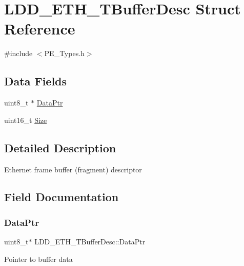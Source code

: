 \hypertarget{struct_l_d_d___e_t_h___t_buffer_desc}{}\section{L\+D\+D\+\_\+\+E\+T\+H\+\_\+\+T\+Buffer\+Desc Struct Reference}
\label{struct_l_d_d___e_t_h___t_buffer_desc}


{\ttfamily \#include $<$P\+E\+\_\+\+Types.\+h$>$}

\subsection*{Data Fields}
\begin{DoxyCompactItemize}
\item 
uint8\+\_\+t $\ast$ \hyperlink{struct_l_d_d___e_t_h___t_buffer_desc_af9049f0d40faa480a4de3532a1de4605}{Data\+Ptr}
\item 
uint16\+\_\+t \hyperlink{struct_l_d_d___e_t_h___t_buffer_desc_abddc4273b732d3cf44ff0b6870d6b87a}{Size}
\end{DoxyCompactItemize}


\subsection{Detailed Description}
Ethernet frame buffer (fragment) descriptor 

\subsection{Field Documentation}
\mbox{\label{struct_l_d_d___e_t_h___t_buffer_desc_af9049f0d40faa480a4de3532a1de4605}} 
\subsubsection{\texorpdfstring{Data\+Ptr}{DataPtr}}
{\footnotesize\ttfamily uint8\+\_\+t$\ast$ L\+D\+D\+\_\+\+E\+T\+H\+\_\+\+T\+Buffer\+Desc\+::\+Data\+Ptr}

Pointer to buffer data \mbox{\label{struct_l_d_d___e_t_h___t_buffer_desc_abddc4273b732d3cf44ff0b6870d6b87a}} 
